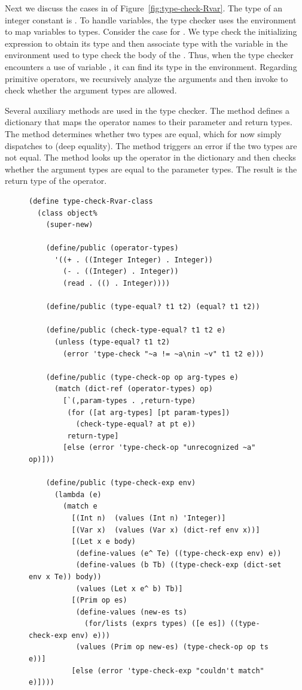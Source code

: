 \documentclass[11pt]{book}
\begin{document}
{Next we discuss the  cases in  of
Figure~\ref{fig:type-check-Rvar}.  The type of an integer constant is
.  To handle variables, the type checker uses the
environment  to map variables to types. Consider the case
for .  We type check the initializing expression to obtain
its type  and then associate type  with the variable
 in the environment used to type check the body of the
. Thus, when the type checker encounters a use of variable
, it can find its type in the environment.  Regarding
primitive operators, we recursively analyze the arguments and then
invoke  to check whether the argument types are
allowed.

Several auxiliary methods are used in the type checker. The method
 defines a dictionary that maps the operator
names to their parameter and return types. The 
method determines whether two types are equal, which for now simply
dispatches to   (deep equality). The
 method triggers an error if the two types are
not equal. The  method looks up the operator in
the  dictionary and then checks whether the
argument types are equal to the parameter types.  The result is the
return type of the operator.

\begin{figure}[tbp]
\begin{lstlisting}[basicstyle=\ttfamily\footnotesize]
(define type-check-Rvar-class
  (class object%
    (super-new)

    (define/public (operator-types)
      '((+ . ((Integer Integer) . Integer))
        (- . ((Integer) . Integer))
        (read . (() . Integer))))

    (define/public (type-equal? t1 t2) (equal? t1 t2))

    (define/public (check-type-equal? t1 t2 e)
      (unless (type-equal? t1 t2)
        (error 'type-check "~a != ~a\nin ~v" t1 t2 e)))

    (define/public (type-check-op op arg-types e)
      (match (dict-ref (operator-types) op)
        [`(,param-types . ,return-type)
         (for ([at arg-types] [pt param-types])
           (check-type-equal? at pt e))
         return-type]
        [else (error 'type-check-op "unrecognized ~a" op)]))

    (define/public (type-check-exp env)
      (lambda (e)
        (match e
          [(Int n)  (values (Int n) 'Integer)]
          [(Var x)  (values (Var x) (dict-ref env x))]
          [(Let x e body)
           (define-values (e^ Te) ((type-check-exp env) e))
           (define-values (b Tb) ((type-check-exp (dict-set env x Te)) body))
           (values (Let x e^ b) Tb)]
          [(Prim op es)
           (define-values (new-es ts)
             (for/lists (exprs types) ([e es]) ((type-check-exp env) e)))
           (values (Prim op new-es) (type-check-op op ts e))]
          [else (error 'type-check-exp "couldn't match" e)])))


\end{lstlisting}
\end{figure}}
\end{document}
